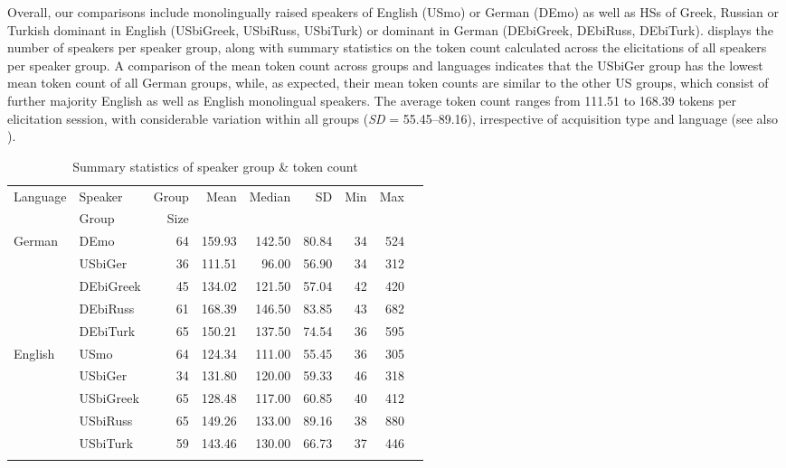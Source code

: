 \documentclass[output=paper,colorlinks,citecolor=brown]{langscibook}
\begin{document}
Overall, our comparisons include monolingually raised speakers of English (USmo) or German (DEmo) as well as HSs of Greek, Russian or Turkish dominant in English (USbiGreek, USbiRuss, USbiTurk) or dominant in German (DEbiGreek, DEbiRuss, DEbiTurk).  displays the number of speakers per speaker group, along with summary statistics on the token count calculated across the elicitations of all speakers per speaker group. A comparison of the mean token count across groups and languages indicates that the USbiGer group has the lowest mean token count of all German groups, while, as expected, their mean token counts are similar to the other US groups, which consist of further majority English as well as English monolingual speakers. The average token count ranges from 111.51 to 168.39 tokens per elicitation session, with considerable variation within all groups (\textit{SD} = 55.45--89.16), irrespective of acquisition type and language (see also \cite{shadrova2024LexDiv}).

\begin{table}[ht]
\caption{Summary statistics of speaker group \& token count}
\begin{tabularx}{\textwidth}{llrrrrrrr}
    \lsptoprule
    Language & Speaker & Group & Mean & Median & SD & Min & Max \\ 
    ~ & Group & Size & ~ & ~ & ~ & ~ & ~ \\ 
    \midrule
    German & DEmo & 64 & 159.93 & 142.50 & 80.84 &  34 & 524 \\
    ~ & USbiGer & 36 & 111.51 & 96.00 & 56.90 &  34 & 312 \\
    ~ & DEbiGreek & 45 & 134.02 & 121.50 & 57.04 &  42 & 420 \\
    ~ & DEbiRuss & 61 & 168.39 & 146.50 & 83.85 &  43 & 682 \\ 
    ~ & DEbiTurk & 65 & 150.21 & 137.50 & 74.54 &  36 & 595 \\ 
    \midrule
    English & USmo & 64 & 124.34 & 111.00 & 55.45 &  36 & 305 \\
    ~ & USbiGer & 34 & 131.80 & 120.00 & 59.33 &  46 & 318 \\
    ~ & USbiGreek & 65 & 128.48 & 117.00 & 60.85 &  40 & 412 \\ 
    ~ & USbiRuss & 65 & 149.26 & 133.00 & 89.16 &  38 & 880 \\ 
    ~ & USbiTurk & 59 & 143.46 & 130.00 & 66.73 &  37 & 446 \\ 
    \lspbottomrule
\end{tabularx}
\label{tab:kelleretal:sumstatstokencount}
\end{table}
\end{document}
